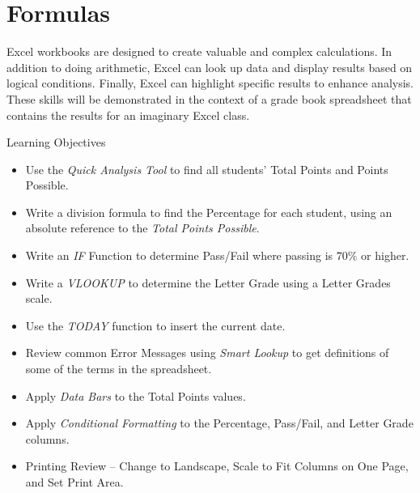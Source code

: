 \chapter{Formulas}\label{ch03:formulas}

Excel workbooks are designed to create valuable and complex calculations. In addition to doing arithmetic, Excel can look up data and display results based on logical conditions. Finally, Excel can highlight specific results to enhance analysis. These skills will be demonstrated in the context of a grade book spreadsheet that contains the results for an imaginary Excel class.

\begin{center}
	\begin{objbox}{Learning Objectives}
		\begin{itemize}
			\setlength{\itemsep}{0pt}
			\setlength{\parskip}{0pt}
			\setlength{\parsep}{0pt}

			\item Use the \textit{Quick Analysis Tool} to find all students' Total Points and Points Possible.
			\item Write a division formula to find the Percentage for each student, using an absolute reference to the \textit{Total Points Possible}.
			\item Write an \textit{IF} Function to determine Pass/Fail where passing is $ 70\% $ or higher.
			\item Write a \textit{VLOOKUP} to determine the Letter Grade using a Letter Grades scale.
			\item Use the \textit{TODAY} function to insert the current date.
			\item Review common Error Messages using \textit{Smart Lookup} to get definitions of some of the terms in the spreadsheet.
			\item Apply \textit{Data Bars} to the Total Points values.
			\item Apply \textit{Conditional Formatting} to the Percentage, Pass/Fail, and Letter Grade columns.
			\item Printing Review – Change to Landscape, Scale to Fit Columns on One Page, and Set Print Area.
			
		\end{itemize}
	\end{objbox}
\end{center}

